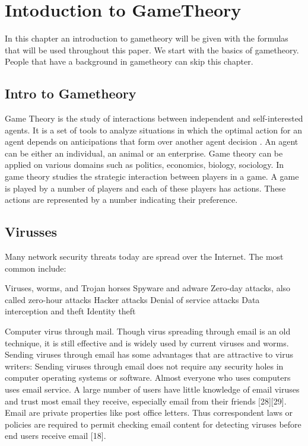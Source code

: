 \chapter{Intoduction to GameTheory}
\label{cha:1}
%

In this chapter an introduction to gametheory will be given with the formulas that will be used throughout this paper. We start with the basics of gametheory. People that have a background in gametheory can skip this chapter.
\section{Intro to Gametheory}

Game Theory is the study of interactions between independent and self-interested agents. It is a set of tools to analyze situations in which the optimal action for an agent depends on anticipations that form over another agent decision . An agent can be either an individual, an animal or an enterprise.  Game theory can be applied on various domains such as politics, economics, biology, sociology.
In game theory studies the strategic interaction between players in a game. A game is played by a number of players and each of these players has actions. These actions are represented by a number indicating their preference. 



\section{Virusses}

Many network security threats today are spread over the Internet. The most common include:

Viruses, worms, and Trojan horses
Spyware and adware
Zero-day attacks, also called zero-hour attacks
Hacker attacks
Denial of service attacks
Data interception and theft
Identity theft


Computer virus through mail. 
Though virus spreading through email is an old technique, it is still effective and is widely used by
current viruses and worms. Sending viruses through email has some advantages that are attractive to
virus writers:
 Sending viruses through email does not require any security holes in computer operating systems
or software.
 Almost everyone who uses computers uses email service.
 A large number of users have little knowledge of email viruses and trust most email they receive,
especially email from their friends [28][29].
 Email are private properties like post office letters. Thus correspondent laws or policies are required
to permit checking email content for detecting viruses before end users receive email [18].

